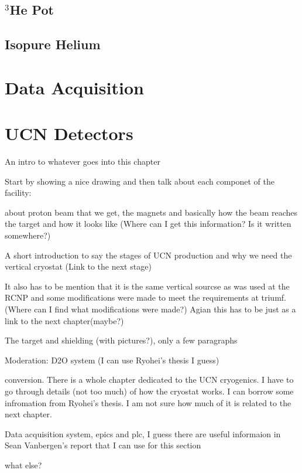 \subsection{$^3$He Pot}

\subsection{Isopure Helium}

\section{Data Acquisition}


\section{UCN Detectors}




\begin{description}
\item{An intro to whatever goes into this chapter}

\item{Start by showing a nice drawing and then talk about each
  componet of the facility:}
  
\item{about proton beam that we get, the magnets and basically how the
  beam reaches the target and how it looks like (Where can I get this
  information? Is it written somewhere?)}
  
\item{A short introduction to say the stages of UCN production and why
  we need the vertical cryostat (Link to the next stage)}
  
\item{It also has to be mention that it is the same vertical sourcse
  as was used at the RCNP and some modifications were made to meet the
  requirements at triumf. (Where can I find what modifications were
  made?) Agian this has to be just as a link to the next chapter(maybe?)}
  
\item{The target and shielding (with pictures?), only a few
  paragraphs}
  
\item{Moderation: D2O system (I can use Ryohei's thesis I guess)}
  
\item{conversion. There is a whole chapter dedicated to the UCN
  cryogenics. I have to go through details (not too much) of how the
  cryostat works. I can borrow some infromation from Ryohei's
  thesis. I am not sure how much of it is related to the next
  chapter.}
 

\item{Data acquisition system, epics and plc, I guess there are useful
  informaion in Sean Vanbergen's report that I can use for this
  section}
  
\item{what else?}

\end{description}

